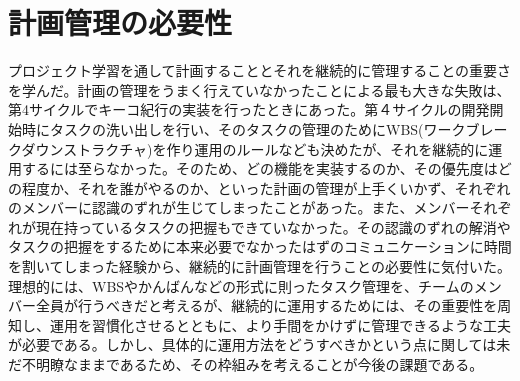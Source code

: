 \section{計画管理の必要性}
プロジェクト学習を通して計画することとそれを継続的に管理することの重要さを学んだ。計画の管理をうまく行えていなかったことによる最も大きな失敗は、第4サイクルでキーコ紀行の実装を行ったときにあった。第４サイクルの開発開始時にタスクの洗い出しを行い、そのタスクの管理のためにWBS(ワークブレークダウンストラクチャ)を作り運用のルールなども決めたが、それを継続的に運用するには至らなかった。そのため、どの機能を実装するのか、その優先度はどの程度か、それを誰がやるのか、といった計画の管理が上手くいかず、それぞれのメンバーに認識のずれが生じてしまったことがあった。また、メンバーそれぞれが現在持っているタスクの把握もできていなかった。その認識のずれの解消やタスクの把握をするために本来必要でなかったはずのコミュニケーションに時間を割いてしまった経験から、継続的に計画管理を行うことの必要性に気付いた。理想的には、WBSやかんばんなどの形式に則ったタスク管理を、チームのメンバー全員が行うべきだと考えるが、継続的に運用するためには、その重要性を周知し、運用を習慣化させるとともに、より手間をかけずに管理できるような工夫が必要である。しかし、具体的に運用方法をどうすべきかという点に関しては未だ不明瞭なままであるため、その枠組みを考えることが今後の課題である。

